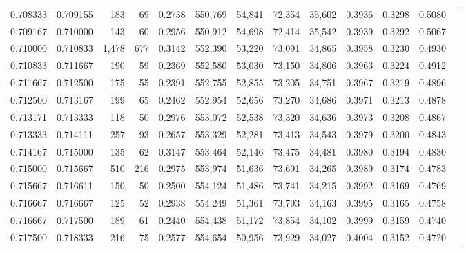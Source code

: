 \begin{tabular}{rrrrrrrrrrrrr}
0.708333 & 0.709155 &   183 &  69 &                                     0.2738 & 550,769 &  54,841 &  72,354 &  35,602 & 0.3936 & 0.3298 & 0.5080 \\
0.709167 & 0.710000 &   143 &  60 &                                     0.2956 & 550,912 &  54,698 &  72,414 &  35,542 & 0.3939 & 0.3292 & 0.5067 \\
0.710000 & 0.710833 & 1,478 & 677 &                                     0.3142 & 552,390 &  53,220 &  73,091 &  34,865 & 0.3958 & 0.3230 & 0.4930 \\
0.710833 & 0.711667 &   190 &  59 &                                     0.2369 & 552,580 &  53,030 &  73,150 &  34,806 & 0.3963 & 0.3224 & 0.4912 \\
0.711667 & 0.712500 &   175 &  55 &                                     0.2391 & 552,755 &  52,855 &  73,205 &  34,751 & 0.3967 & 0.3219 & 0.4896 \\
0.712500 & 0.713167 &   199 &  65 &                                     0.2462 & 552,954 &  52,656 &  73,270 &  34,686 & 0.3971 & 0.3213 & 0.4878 \\
0.713171 & 0.713333 &   118 &  50 &                                     0.2976 & 553,072 &  52,538 &  73,320 &  34,636 & 0.3973 & 0.3208 & 0.4867 \\
0.713333 & 0.714111 &   257 &  93 &                                     0.2657 & 553,329 &  52,281 &  73,413 &  34,543 & 0.3979 & 0.3200 & 0.4843 \\
0.714167 & 0.715000 &   135 &  62 &                                     0.3147 & 553,464 &  52,146 &  73,475 &  34,481 & 0.3980 & 0.3194 & 0.4830 \\
0.715000 & 0.715667 &   510 & 216 &                                     0.2975 & 553,974 &  51,636 &  73,691 &  34,265 & 0.3989 & 0.3174 & 0.4783 \\
0.715667 & 0.716611 &   150 &  50 &                                     0.2500 & 554,124 &  51,486 &  73,741 &  34,215 & 0.3992 & 0.3169 & 0.4769 \\
0.716667 & 0.716667 &   125 &  52 &                                     0.2938 & 554,249 &  51,361 &  73,793 &  34,163 & 0.3995 & 0.3165 & 0.4758 \\
0.716667 & 0.717500 &   189 &  61 &                                     0.2440 & 554,438 &  51,172 &  73,854 &  34,102 & 0.3999 & 0.3159 & 0.4740 \\
0.717500 & 0.718333 &   216 &  75 &                                     0.2577 & 554,654 &  50,956 &  73,929 &  34,027 & 0.4004 & 0.3152 & 0.4720 \\

\end{tabular}
